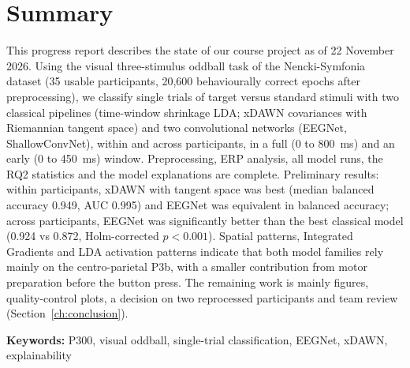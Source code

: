 \section*{Summary}
This progress report describes the state of our course project as of 22 November 2026. Using the visual three-stimulus oddball task of the Nencki-Symfonia dataset (35 usable participants, 20,600 behaviourally correct epochs after preprocessing), we classify single trials of target versus standard stimuli with two classical pipelines (time-window shrinkage LDA; xDAWN covariances with Riemannian tangent space) and two convolutional networks (EEGNet, ShallowConvNet), within and across participants, in a full (0 to 800~ms) and an early (0 to 450~ms) window. Preprocessing, ERP analysis, all model runs, the RQ2 statistics and the model explanations are complete. Preliminary results: within participants, xDAWN with tangent space was best (median balanced accuracy 0.949, AUC 0.995) and EEGNet was equivalent in balanced accuracy; across participants, EEGNet was significantly better than the best classical model (0.924 vs 0.872, Holm-corrected $p < 0.001$). Spatial patterns, Integrated Gradients and LDA activation patterns indicate that both model families rely mainly on the centro-parietal P3b, with a smaller contribution from motor preparation before the button press. The remaining work is mainly figures, quality-control plots, a decision on two reprocessed participants and team review (Section~\ref{ch:conclusion}).

\noindent\textbf{Keywords:} P300, visual oddball, single-trial classification, EEGNet, xDAWN, explainability
